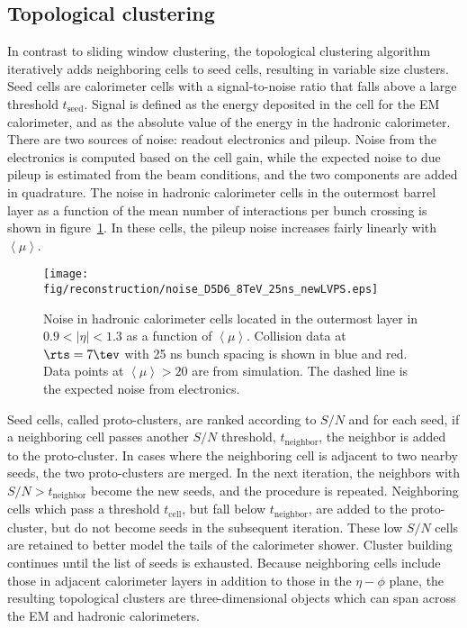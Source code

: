 \subsection{Topological clustering}
\label{chap:reconstruction:sec:cluster:subsec:topo}

In contrast to sliding window clustering, the topological clustering
algorithm iteratively adds neighboring cells to seed cells, resulting in variable
size clusters. Seed cells are calorimeter cells with a signal-to-noise
ratio that falls above a large threshold $t_{\textrm{seed}}$. Signal
is defined as the energy deposited in the cell for the EM calorimeter,
and as the absolute value of the energy in the hadronic
calorimeter. There are two sources of noise: readout electronics and
pileup. Noise from the electronics is computed based on the cell
gain, while the expected noise to due pileup is estimated from the
beam conditions, and the two components are added in quadrature. The
noise in hadronic calorimeter cells in the outermost barrel layer as a
function of the mean number of interactions per bunch crossing is
shown in figure~\ref{chap:reconstruction:fig:tile_noise}. In these
cells, the pileup noise increases fairly linearly with $\left \langle \mu \right \rangle$.

\begin{figure}[h]
    \centering
    \texttt{[image: fig/reconstruction/noise\_D5D6\_8TeV\_25ns\_newLVPS.eps]}
    \caption[]{Noise in hadronic calorimeter cells located in the
    outermost layer in $0.9 < |\eta| < 1.3$ as a function of
    $\left \langle \mu \right \rangle$. Collision data at $\rts = 7 \tev$ with 25 ns bunch spacing
    is shown in blue and red. Data points at $\left \langle \mu \right \rangle > 20$ are from
    simulation. The dashed line is the expected noise from
    electronics.\cite{bib:Araque:1561207}}
\label{chap:reconstruction:fig:tile_noise}
\end{figure}

Seed cells, called proto-clusters, are ranked according to $S/N$ and for
each seed, if a neighboring cell passes another $S/N$ threshold,
$t_{\textrm{neighbor}}$, the neighbor is added to the
proto-cluster. In cases where the neighboring cell is adjacent to two
nearby seeds, the two proto-clusters are merged. In the next
iteration, the neighbors with $S/N > t_{\textrm{neighbor}}$ become the
new seeds, and the procedure is repeated. Neighboring cells
which pass a threshold $t_{\textrm{cell}}$, but fall below
$t_{\textrm{neighbor}}$, are added to the proto-cluster, but do not
become seeds in the subsequent iteration. These low $S/N$ cells are
retained to better model the tails of the calorimeter shower. Cluster
building continues until the list of seeds is exhausted. Because
neighboring cells include those in adjacent calorimeter layers in
addition to those in the $\eta-\phi$ plane, the
resulting topological clusters are three-dimensional objects which
can span across the EM and hadronic calorimeters. 

